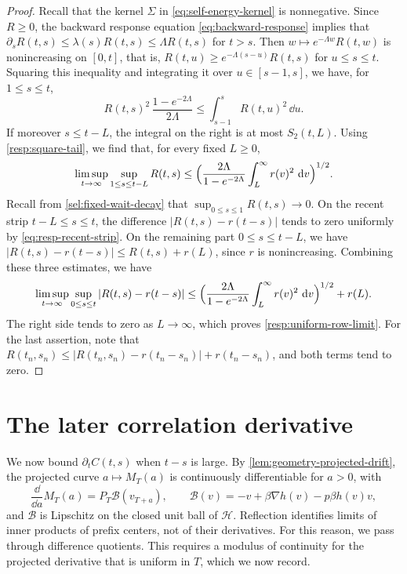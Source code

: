 \begin{proof}
Recall that the kernel $\Sigma$ in \eqref{eq:self-energy-kernel} is nonnegative. Since $R\ge0$, the backward response equation \eqref{eq:backward-response} implies that $\partial_sR(t,s)\le\lambda(s)R(t,s)\le\Lambda R(t,s)$ for $t>s$. Then $w\mapsto e^{-\Lambda w}R(t,w)$ is nonincreasing on $[0,t]$, that is, $R(t,u)\ge e^{-\Lambda(s-u)}R(t,s)$ for $u\le s\le t$. Squaring this inequality and integrating it over $u\in[s-1,s]$, we have, for $1\le s\le t$,
\[
 R(t,s)^2\,\frac{1-e^{-2\Lambda}}{2\Lambda}\le\int_{s-1}^sR(t,u)^2\,\dd u.
\]
If moreover $s\le t-L$, the integral on the right is at most $S_2(t,L)$. Using \eqref{resp:square-tail}, we find that, for every fixed $L\ge0$,
\[
 \limsup_{t\to\infty}\sup_{1\le s\le t-L}R(t,s)
 \le\Bigl(\frac{2\Lambda}{1-e^{-2\Lambda}}\int_L^\infty r(v)^2\,\mathop{}\!\mathrm d v\Bigr)^{1/2}.
\]
Recall from \eqref{sel:fixed-wait-decay} that $\sup_{0\le s\le1}R(t,s)\to0$. On the recent strip $t-L\le s\le t$, the difference $|R(t,s)-r(t-s)|$ tends to zero uniformly by \eqref{eq:resp-recent-strip}. On the remaining part $0\le s\le t-L$, we have $|R(t,s)-r(t-s)|\le R(t,s)+r(L)$, since $r$ is nonincreasing. Combining these three estimates, we have
\[
 \limsup_{t\to\infty}\sup_{0\le s\le t}|R(t,s)-r(t-s)|
 \le\Bigl(\frac{2\Lambda}{1-e^{-2\Lambda}}\int_L^\infty r(v)^2\,\mathop{}\!\mathrm d v\Bigr)^{1/2}+r(L).
\]
The right side tends to zero as $L\to\infty$, which proves \eqref{resp:uniform-row-limit}. For the last assertion, note that $R(t_n,s_n)\le|R(t_n,s_n)-r(t_n-s_n)|+r(t_n-s_n)$, and both terms tend to zero.
\end{proof}

\section{The later correlation derivative}\label{sec:resp-later-derivative}

We now bound $\partial_tC(t,s)$ when $t-s$ is large. By \cref{lem:geometry-projected-drift}, the projected curve $a\mapsto M_T(a)$ is continuously differentiable for $a>0$, with
\[
 \frac{\dd}{\dd a}M_T(a)=P_T\mathcal B(v_{T+a}),\qquad
 \mathcal B(v)=-v+\beta\nabla h(v)-p\beta h(v)v,
\]
and $\mathcal B$ is Lipschitz on the closed unit ball of $\mathcal H$. Reflection identifies limits of inner products of prefix centers, not of their derivatives. For this reason, we pass through difference quotients. This requires a modulus of continuity for the projected derivative that is uniform in $T$, which we now record.

